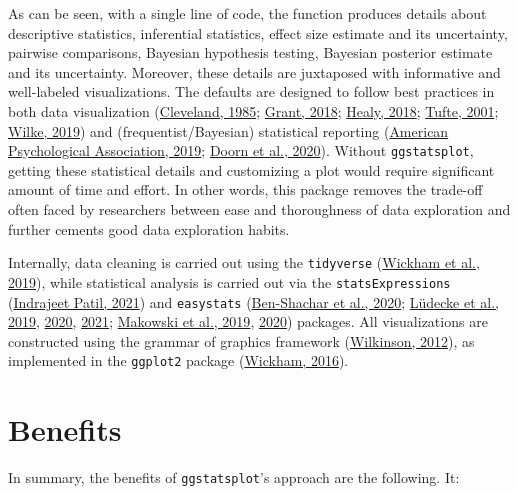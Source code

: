 \documentclass[10pt,a4paper,onecolumn]{article}
\begin{document}
As can be seen, with a single line of code, the function produces
details about descriptive statistics, inferential statistics, effect
size estimate and its uncertainty, pairwise comparisons, Bayesian
hypothesis testing, Bayesian posterior estimate and its uncertainty.
Moreover, these details are juxtaposed with informative and well-labeled
visualizations. The defaults are designed to follow best practices in
both data visualization
(\protect\hyperlink{ref-cleveland1985}{Cleveland, 1985};
\protect\hyperlink{ref-grant2018data}{Grant, 2018};
\protect\hyperlink{ref-healy2018data}{Healy, 2018};
\protect\hyperlink{ref-tufte2001}{Tufte, 2001};
\protect\hyperlink{ref-wilke2019fundamentals}{Wilke, 2019}) and
(frequentist/Bayesian) statistical reporting
(\protect\hyperlink{ref-apa2019}{American Psychological Association,
2019}; \protect\hyperlink{ref-van2020jasp}{Doorn et al., 2020}). Without
\texttt{ggstatsplot}, getting these statistical details and customizing
a plot would require significant amount of time and effort. In other
words, this package removes the trade-off often faced by researchers
between ease and thoroughness of data exploration and further cements
good data exploration habits.

Internally, data cleaning is carried out using the \texttt{tidyverse}
(\protect\hyperlink{ref-Wickham2019}{Wickham et al., 2019}), while
statistical analysis is carried out via the \texttt{statsExpressions}
(\protect\hyperlink{ref-Patil2021}{Indrajeet Patil, 2021}) and
\texttt{easystats} (\protect\hyperlink{ref-Ben-Shachar2020}{Ben-Shachar
et al., 2020}; \protect\hyperlink{ref-Luxfcdecke2019}{Lüdecke et al.,
2019}, \protect\hyperlink{ref-Luxfcdecke2020parameters}{2020},
\protect\hyperlink{ref-Luxfcdecke2020performance}{2021};
\protect\hyperlink{ref-Makowski2019}{Makowski et al., 2019},
\protect\hyperlink{ref-Makowski2020}{2020}) packages. All visualizations
are constructed using the grammar of graphics framework
(\protect\hyperlink{ref-Wilkinson2012}{Wilkinson, 2012}), as implemented
in the \texttt{ggplot2} package
(\protect\hyperlink{ref-Wickham2016}{Wickham, 2016}).

\hypertarget{benefits}{%
\section{Benefits}\label{benefits}}

In summary, the benefits of \texttt{ggstatsplot}'s approach are the
following. It:
\end{document}
